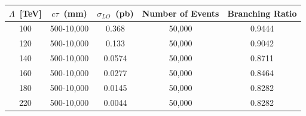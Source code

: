 \vspace{5mm}
\begin{minipage}{0.90\linewidth} 
\begin{center}
\centering
\begin{tabular}{c c c c c}
       \toprule
        \hline
        $\Lambda$~[TeV] & $c\tau$~(mm) & $\sigma_{LO}$~(pb) & \bfseries{Number of Events} & \bfseries{Branching Ratio}\\
       \hline
       \toprule
       100 & 500-10,000  & 0.368  & 50,000 & 0.9444\\
       120 & 500-10,000  & 0.133  & 50,000 & 0.9042\\
       140 & 500-10,000  & 0.0574 & 50,000 & 0.8711\\
       160 & 500-10,000  & 0.0277 & 50,000 & 0.8464\\
       180 & 500-10,000  & 0.0145 & 50,000 & 0.8282\\
       220 & 500-10,000  & 0.0044 & 50,000 & 0.8282\\
       \hline
       \bottomrule
       \end{tabular}  
\label{tab:mc_GMSB_sample}
\end{center}
\end{minipage}


